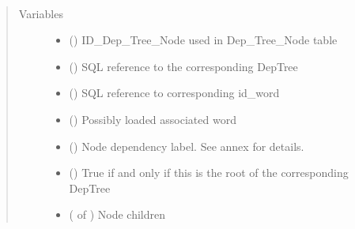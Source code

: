 \documentclass[letterpaper,10pt,english]{sphinxmanual}
\begin{document}
\begin{fulllineitems}
\label{\detokenize{index:loacore.classes.classes.DepTreeNode}}~\begin{quote}\begin{description}
\item[{Variables}] \leavevmode\begin{itemize}
\item {} 
 () \textendash{} ID\_Dep\_Tree\_Node used in Dep\_Tree\_Node table

\item {} 
 () \textendash{} SQL reference to the corresponding DepTree

\item {} 
 () \textendash{} SQL reference to corresponding id\_word

\item {} 
 ({\hyperref[\detokenize{index:loacore.classes.classes.Word}]{}}) \textendash{} Possibly loaded associated word

\item {} 
 () \textendash{} Node dependency label. See annex for details.

\item {} 
 () \textendash{} True if and only if this is the root of the corresponding DepTree

\item {} 
 ( of {\hyperref[\detokenize{index:loacore.classes.classes.DepTreeNode}]{}}) \textendash{} Node children

\end{itemize}

\end{description}\end{quote}

\end{fulllineitems}
\end{document}
